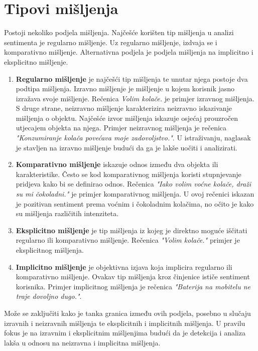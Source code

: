 \documentclass[times, utf8, zavrsni, numeric]{fer}
\begin{document}
\section{Tipovi mišljenja} \label{samisljenje}
Postoji nekoliko podjela mišljenja. 
Najčešće korišten tip mišljenja u analizi sentimenta je regularno mišljenje.
Uz regularno mišljenje, izdvaja se i komparativno mišljenje.
Alternativna podjela je podjela mišljenja na implicitno i eksplicitno mišljenje.

\begin{enumerate}
  \item \textbf{Regularno mišljenje} je najčešći tip mišljenja te unutar njega postoje dva podtipa mišljenja.
  Izravno mišljenje je mišljenje u kojem korisnik jasno izražava svoje mišljenje. 
  Rečenica \textit{Volim kolače.} je primjer izravnog mišljenja.
  S druge strane, neizravno mišljenje karakterizira neizravno iskazivanje mišljenja o objektu.
  Najčešće izvor mišljenja iskazuje osjećaj prouzročen utjecajem objekta na njega.
  Primjer neizravnog mišljenja je rečenica \textit{"Konzumiranje kolača povećava moje zadovoljstvo."}.
  U istraživanju, naglasak je stavljen na izravno mišljenje budući da ga je lakše uočiti i analizirati.

  \item \textbf{Komparativno mišljenje} iskazuje odnos između dva objekta ili karakteristike.
  Često se kod komparativnog mišljenja koristi stupnjevanje pridjeva kako bi se definirao 
  odnos. 
  Rečenica \textit{"Iako volim voćne kolače, draži su mi čokoladni."} je primjer komparativnog mišljenja.
  U ovoj rečenici iskazan je pozitivan sentiment prema voćnim i čokoladnim kolačima, no očito je
  kako su mišljenja različitih intenziteta.

  \item \textbf{Eksplicitno mišljenje} je tip mišljenja iz kojeg je direktno moguće iščitati
  regularno ili komparativno mišljenje. Rečenica \textit{"Volim kolače."} primjer je eksplicitnog
  mišljenja.

  \item \textbf{Implicitno mišljenje} je objektivna izjava koja implicira regularno ili komparativno
  mišljenje. Ovakav tip mišljenja kroz činjenice ističe sentiment korisnika.
  Primjer implicitnog mišljenja je rečenica \textit{"Baterija na mobitelu ne traje dovoljno dugo."}.
\end{enumerate}

Može se zaključiti kako je tanka granica između ovih podjela, posebno u slučaju izravnih i neizravnih
mišljenja te eksplicitnih i implicitnih mišljenja. U pravilu fokus je na izravnim i eksplicitnim
mišljenjima budući da je detekcija i analiza lakša u odnosu na neizravna i implicitna mišljenja.
\end{document}
